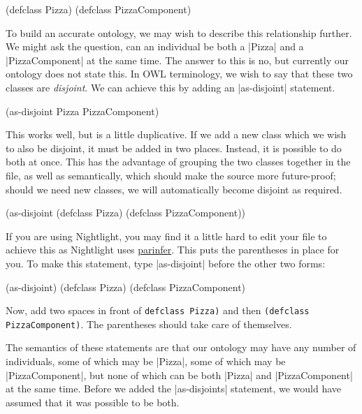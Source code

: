 \begin{tawnyexample}
(defclass Pizza)
(defclass PizzaComponent)
\end{tawnyexample}

To build an accurate ontology, we may wish to describe this relationship
further. We might ask the question, can an individual be both a |Pizza|
and a |PizzaComponent| at the same time. The answer to this is no, but
currently our ontology does not state this. In OWL terminology, we wish
to say that these two classes are \emph{disjoint}. We can achieve this by
adding an |as-disjoint| statement.

\begin{tawnyexample}
(as-disjoint Pizza PizzaComponent)
\end{tawnyexample}

This works well, but is a little duplicative. If we add a new class
which we wish to also be disjoint, it must be added in two places.
Instead, it is possible to do both at once. This has the advantage of
grouping the two classes together in the file, as well as semantically,
which should make the source more future-proof; should we need new
classes, we will automatically become disjoint as required.

\begin{tawny}
(as-disjoint
 (defclass Pizza)
 (defclass PizzaComponent))
\end{tawny}

If you are using Nightlight, you may find it a little hard to edit
your file to achieve this as Nightlight uses
\href{http://shaunlebron.github.io/parinfer/}{parinfer}. This puts the
parentheses in place for you. To make this statement, type
|as-disjoint| before the other two forms:

\begin{tawnyexample}
(as-disjoint)
(defclass Pizza)
(defclass PizzaComponent)
\end{tawnyexample}

Now, add two spaces in front of \lstinline|defclass Pizza)| and then
\lstinline|(defclass PizzaComponent)|. The parentheses should take care of themselves.

The semantics of these statements are that our ontology may have any
number of individuals, some of which may be |Pizza|, some of which may
be |PizzaComponent|, but none of which can be both |Pizza| and
|PizzaComponent| at the same time. Before we added the |as-disjoints|
statement, we would have assumed that it was possible to be both.


